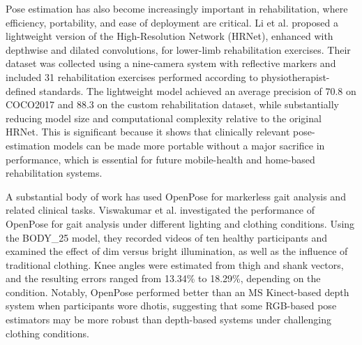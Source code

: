 \documentclass[12pt]{elsarticle}
\begin{document}
Pose estimation has also become increasingly important in rehabilitation, where efficiency, portability, and ease of deployment are critical. Li et al. \cite{li2020human} proposed a lightweight version of the High-Resolution Network (HRNet), enhanced with depthwise and dilated convolutions, for lower-limb rehabilitation exercises. Their dataset was collected using a nine-camera system with reflective markers and included 31 rehabilitation exercises performed according to physiotherapist-defined standards. The lightweight model achieved an average precision of 70.8 on COCO2017 and 88.3 on the custom rehabilitation dataset, while substantially reducing model size and computational complexity relative to the original HRNet. This is significant because it shows that clinically relevant pose-estimation models can be made more portable without a major sacrifice in performance, which is essential for future mobile-health and home-based rehabilitation systems.

A substantial body of work has used OpenPose for markerless gait analysis and related clinical tasks. Viswakumar et al. \cite{viswakumar2019human} investigated the performance of OpenPose for gait analysis under different lighting and clothing conditions. Using the BODY\_25 model, they recorded videos of ten healthy participants and examined the effect of dim versus bright illumination, as well as the influence of traditional clothing. Knee angles were estimated from thigh and shank vectors, and the resulting errors ranged from 13.34\% to 18.29\%, depending on the condition. Notably, OpenPose performed better than an MS Kinect-based depth system when participants wore dhotis, suggesting that some RGB-based pose estimators may be more robust than depth-based systems under challenging clothing conditions. 
\end{document}
